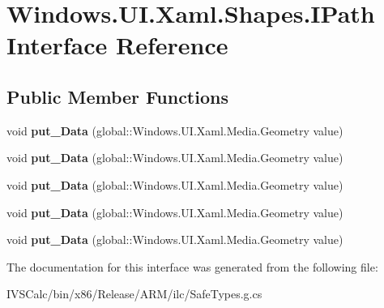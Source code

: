 \hypertarget{interface_windows_1_1_u_i_1_1_xaml_1_1_shapes_1_1_i_path}{}\section{Windows.\+U\+I.\+Xaml.\+Shapes.\+I\+Path Interface Reference}
\label{interface_windows_1_1_u_i_1_1_xaml_1_1_shapes_1_1_i_path}
\subsection*{Public Member Functions}
\begin{DoxyCompactItemize}
\item 
\mbox{\label{interface_windows_1_1_u_i_1_1_xaml_1_1_shapes_1_1_i_path_af2cce1ca140519a26742b72338a628dd}} 
void {\bfseries put\+\_\+\+Data} (global\+::\+Windows.\+U\+I.\+Xaml.\+Media.\+Geometry value)
\item 
\mbox{\label{interface_windows_1_1_u_i_1_1_xaml_1_1_shapes_1_1_i_path_af2cce1ca140519a26742b72338a628dd}} 
void {\bfseries put\+\_\+\+Data} (global\+::\+Windows.\+U\+I.\+Xaml.\+Media.\+Geometry value)
\item 
\mbox{\label{interface_windows_1_1_u_i_1_1_xaml_1_1_shapes_1_1_i_path_af2cce1ca140519a26742b72338a628dd}} 
void {\bfseries put\+\_\+\+Data} (global\+::\+Windows.\+U\+I.\+Xaml.\+Media.\+Geometry value)
\item 
\mbox{\label{interface_windows_1_1_u_i_1_1_xaml_1_1_shapes_1_1_i_path_af2cce1ca140519a26742b72338a628dd}} 
void {\bfseries put\+\_\+\+Data} (global\+::\+Windows.\+U\+I.\+Xaml.\+Media.\+Geometry value)
\item 
\mbox{\label{interface_windows_1_1_u_i_1_1_xaml_1_1_shapes_1_1_i_path_af2cce1ca140519a26742b72338a628dd}} 
void {\bfseries put\+\_\+\+Data} (global\+::\+Windows.\+U\+I.\+Xaml.\+Media.\+Geometry value)
\end{DoxyCompactItemize}


The documentation for this interface was generated from the following file\+:\begin{DoxyCompactItemize}
\item 
I\+V\+S\+Calc/bin/x86/\+Release/\+A\+R\+M/ilc/Safe\+Types.\+g.\+cs\end{DoxyCompactItemize}
